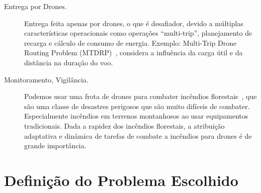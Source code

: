 \documentclass[12pt, a4paper]{article}
\begin{document}
\begin{description}
\begin{description}
\begin{description}
			\item [Entrega por Drones.] Entrega feita apenas por drones, o que é desafiador, devido a múltiplas características operacionais como operações ``multi-trip'', planejamento de recarga e cálculo de consumo de energia. Exemplo: Multi-Trip Drone Routing Problem (MTDRP)~\cite{cheng2018formulations}, considera a influência da carga útil e da distância na duração do voo.
			
			\item [Monitoramento, Vigilância.] Podemos usar uma frota de drones para combater incêndios florestais~\cite{chen2018adaptive}, que são uma classe de desastres perigosos que são muito difíceis de combater. Especialmente incêndios em terrenos montanhosos ao usar equipamentos tradicionais. Dada a rapidez dos incêndios florestais, a atribuição adaptativa e dinâmica de tarefas de combate a incêndios para drones é de grande importância.  
		\end{description}
	\end{description}
\end{description}



\section{Definição do Problema Escolhido}\label{sec:problem}
\end{document}
